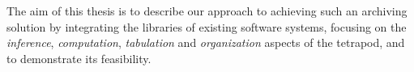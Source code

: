 The aim of this thesis is to describe our approach to achieving such an archiving solution by integrating the libraries of existing software systems, focusing on the \emph{inference}, \emph{computation}, \emph{tabulation} and \emph{organization} aspects of the tetrapod, and to demonstrate its feasibility.
